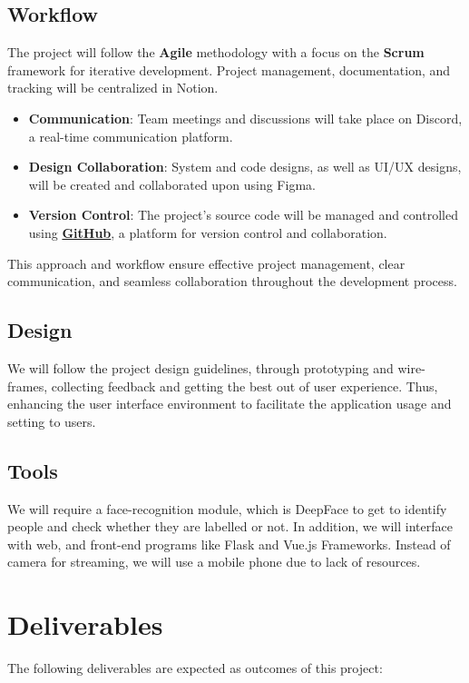\documentclass[a4 paper, 12pt]{article}
\begin{document}
\subsection{Workflow}
The project will follow the \textbf{Agile} methodology with a focus on the \textbf{Scrum} framework for iterative development. Project management, documentation, and tracking will be centralized in Notion.

\begin{itemize}
    \item \textbf{Communication}: Team meetings and discussions will take place on Discord, a real-time communication platform.

    \item \textbf{Design Collaboration}: System and code designs, as well as UI/UX designs, will be created and collaborated upon using Figma.

    \item \textbf{Version Control}: The project's source code will be managed and controlled using \href{https://github.com/HCI26}{\textbf{GitHub}}, a platform for version control and collaboration.
\end{itemize}

This approach and workflow ensure effective project management, clear communication, and seamless collaboration throughout the development process.

\subsection{Design}
We will follow the project design guidelines, through prototyping and wire-frames, collecting feedback and getting the best out of user experience. Thus, enhancing the user interface environment to facilitate the application usage and setting to users.
\subsection{Tools}
We will require a face-recognition module, which is DeepFace to get to identify people and check whether they are labelled or not. In addition, we will interface with web, and front-end programs like Flask and Vue.js Frameworks.
Instead of camera for streaming, we will use a mobile phone due to lack of resources.
\section{Deliverables}

The following deliverables are expected as outcomes of this project:
\end{document}
